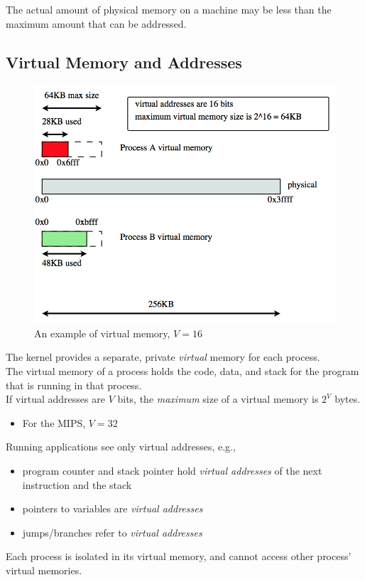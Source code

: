 \documentclass[12pt]{article}
\theoremstyle{plain}
\theoremstyle{definition}
\begin{document}
The actual amount of physical memory on a machine may be less than the maximum amount that can be addressed.

\subsection{Virtual Memory and Addresses}
\begin{figure}[!h]
  \centering
  \includegraphics[scale=0.65]{pictures/v_mem.png}
  \caption{An example of virtual memory, $V = 16$}
  \label{fig:v_mem}
\end{figure}
The kernel provides a separate, private \emph{virtual} memory for each process. \\
The virtual memory of a process holds the code, data, and stack for the program that is running in that process. \\
If virtual addresses are $V$ bits, the \emph{maximum} size of a virtual memory is $2^{V}$ bytes.
\begin{itemize}
  \item For the MIPS, $V = 32$
\end{itemize}
Running applications see only virtual addresses, e.g.,
\begin{itemize}
  \item program counter and stack pointer hold \emph{virtual addresses} of the next instruction and the stack
  \item pointers to variables are \emph{virtual addresses}
  \item jumps/branches refer to \emph{virtual addresses}
\end{itemize}
Each process is isolated in its virtual memory, and cannot access other process' virtual memories.
\end{document}
